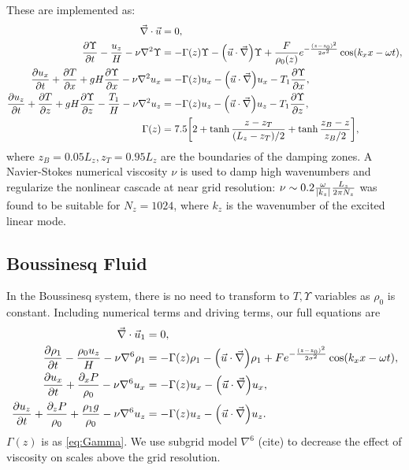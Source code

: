 \documentclass[twocolumn,
        usenames, %
        dvipsnames %
    ]{revtex4-1}%
\newcommand*{\pd}[2]{\frac{\partial#1}{\partial#2}}
\DeclarePairedDelimiter\abs{\lvert}{\rvert}
\DeclarePairedDelimiter\p{\lparen}{\rparen}
\DeclarePairedDelimiter\s{\lbrack}{\rbrack}
\begin{document}
These are implemented as:
\begin{subequations}\label{se:curr_num}
    \begin{align}
        \vec{\nabla} \cdot \vec{u} &= 0,\\
        \pd{\Upsilon}{t} - \frac{u_z}{H}
            - \nu \nabla^2 \Upsilon &= -\Gamma(z) \Upsilon
                - \p*{\vec{u} \cdot \vec{\nabla}}\Upsilon
                + \frac{F}{\rho_0(z)}e^{-\frac{(z - z_0)^2}{2\sigma^2}}
                    \cos \p*{k_xx - \omega t},\\
        \pd{u_x}{t} + \pd{T}{x} + gH\pd{\Upsilon}{x}
            - \nu \nabla^2 u_x
            &= -\Gamma(z) u_x
                - \p*{\vec{u} \cdot \vec{\nabla}}u_x
                - T_1 \pd{\Upsilon}{x},\\
        \pd{u_z}{t} + \pd{T}{z} + gH\pd{\Upsilon}{z} - \frac{T_1}{H}
            - \nu \nabla^2 u_z &= -\Gamma(z) u_z
                - \p*{\vec{u} \cdot \vec{\nabla}}u_z
                - T_1 \pd{\Upsilon}{z},\\
    \Gamma(z) &= 7.5\s*{2 + \tanh \frac{z - z_T}{(L_z - z_T) / 2}
        + \tanh \frac{z_B - z}{z_B / 2}},\label{eq:Gamma}
    \end{align}
\end{subequations}
where $z_B = 0.05L_z, z_T = 0.95L_z$ are the boundaries of the damping zones. A
Navier-Stokes numerical viscosity $\nu$ is used to damp high wavenumbers and
regularize the nonlinear cascade at near grid resolution: $\nu \sim 0.2
\frac{\omega}{\abs*{k_z}}\frac{L_z}{2\pi N_z}$ was found to be suitable for $N_z
= 1024$, where $k_z$ is the wavenumber of the excited linear mode.

\subsection{Boussinesq Fluid}\label{ss:bouss_impl}

In the Boussinesq system, there is no need to transform to $T, \Upsilon$
variables as $\rho_0$ is constant. Including numerical terms and driving terms,
our full equations are
\begin{subequations}\label{se:bouss_num}
    \begin{align}
        \vec{\nabla} \cdot \vec{u}_1 &= 0,\\
        \pd{\rho_1}{t} - \frac{\rho_0 u_z}{H}
            - \nu \nabla^6 \rho_1
            &= -\Gamma(z) \rho_1
                - \p*{\vec{u} \cdot \vec{\nabla}}\rho_1
                + Fe^{-\frac{(z - z_0)^2}{2\sigma^2}}
                    \cos \p*{k_xx - \omega t},\\
        \pd{u_x}{t} + \frac{\partial_x P}{\rho_0}
            - \nu \nabla^6 u_x
            &= -\Gamma(z) u_x
                - \p*{\vec{u} \cdot \vec{\nabla}}u_x,\\
        \pd{u_z}{t} + \frac{\partial_z P}{\rho_0}
            + \frac{\rho_1 g}{\rho_0}
            - \nu \nabla^6 u_z
            &= -\Gamma(z) u_z
                - \p*{\vec{u} \cdot \vec{\nabla}}u_z.
    \end{align}
\end{subequations}
$\Gamma(z)$ is as \autoref{eq:Gamma}. We use subgrid model $\nabla^6$ (cite) to
decrease the effect of viscosity on scales above the grid resolution.
\end{document}
